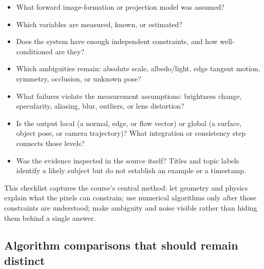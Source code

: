 \begin{itemize}
\tightlist
\item
  What forward image-formation or projection model was assumed?
\item
  Which variables are measured, known, or estimated?
\item
  Does the system have enough independent constraints, and how well-conditioned are they?
\item
  Which ambiguities remain: absolute scale, albedo/light, edge tangent motion, symmetry, occlusion, or unknown pose?
\item
  What failures violate the measurement assumptions: brightness change, specularity, aliasing, blur, outliers, or lens distortion?
\item
  Is the output local (a normal, edge, or flow vector) or global (a surface, object pose, or camera trajectory)? What integration or consistency step connects those levels?
\item
  Was the evidence inspected in the source itself? Titles and topic labels identify a likely subject but do not establish an example or a timestamp.
\end{itemize}

This checklist captures the course's central method: let geometry and physics explain what the pixels can constrain; use numerical algorithms only after those constraints are understood; make ambiguity and noise visible rather than hiding them behind a single answer.

\subsection{Algorithm comparisons that should remain distinct}\label{04-visual-computing-ii-ch034-algorithm-comparisons-that-should-remain-distinct}

